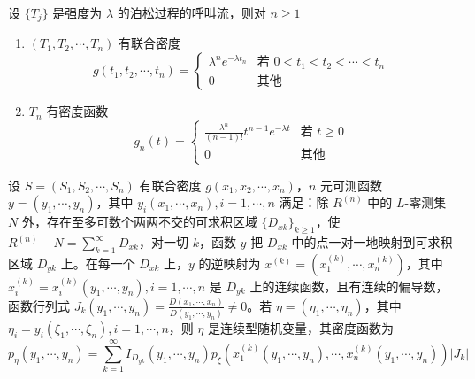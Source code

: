 \documentclass[lang=cn,10pt,thmcnt=section]{elegantbook}
\begin{document}
\begin{theorem}
	设 $\{T_j\}$ 是强度为 $\lambda$ 的泊松过程的呼叫流，则对 $n \geq 1$
\begin{enumerate}
    \item $(T_1, T_2, \cdots, T_n)$ 有联合密度
    \[
    g(t_1, t_2, \cdots, t_n) = 
    \begin{cases} 
    \lambda^n e^{-\lambda t_n} & \text{若 } 0 < t_1 < t_2 < \cdots < t_n \\
    0 & \text{其他}
    \end{cases}
    \]
    \item $T_n$ 有密度函数
    \[
    g_n(t) = 
    \begin{cases} 
    \frac{\lambda^n}{(n-1)!} t^{n-1} e^{-\lambda t} & \text{若 } t \geq 0 \\
    0 & \text{其他}
    \end{cases}
    \]
\end{enumerate}
\end{theorem}

设 \( S = (S_1, S_2, \cdots, S_n) \) 有联合密度 \( g(x_1, x_2, \cdots, x_n) \)，\( n \) 元可测函数 \( y = (y_1, \cdots, y_n) \)，其中 \( y_i(x_1, \cdots, x_n), i = 1, \cdots, n \) 满足：除 \( R^{(n)} \) 中的 \( L \)-零测集 \( N \) 外，存在至多可数个两两不交的可求积区域 \( \{D_{xk}\}_{k \geq 1} \)，使 \( R^{(n)} - N = \sum_{k=1}^{\infty} D_{xk} \)，对一切 \( k \)，函数 \( y \) 把 \( D_{xk} \) 中的点一对一地映射到可求积区域 \( D_{yk} \) 上。在每一个 \( D_{xk} \) 上，\( y \) 的逆映射为 \( x^{(k)} = (x_1^{(k)}, \cdots, x_n^{(k)}) \)，其中 \( x_i^{(k)} = x_i^{(k)}(y_1, \cdots, y_n), i = 1, \cdots, n \) 是 \( D_{yk} \) 上的连续函数，且有连续的偏导数，函数行列式 \( J_k(y_1, \cdots, y_n) = \frac{D(x_1, \cdots, x_n)}{D(y_1, \cdots, y_n)} \neq 0 \)。若 \( \eta = (\eta_1, \cdots, \eta_n) \)，其中 \( \eta_i = y_i(\xi_1, \cdots, \xi_n), i = 1, \cdots, n \)，则 \( \eta \) 是连续型随机变量，其密度函数为
\[
p_\eta(y_1, \cdots, y_n) = \sum_{k=1}^{\infty} I_{D_{yk}}(y_1, \cdots, y_n) p_\xi(x_1^{(k)}(y_1, \cdots, y_n), \cdots, x_n^{(k)}(y_1, \cdots, y_n)) |J_k|
\]
\end{document}
